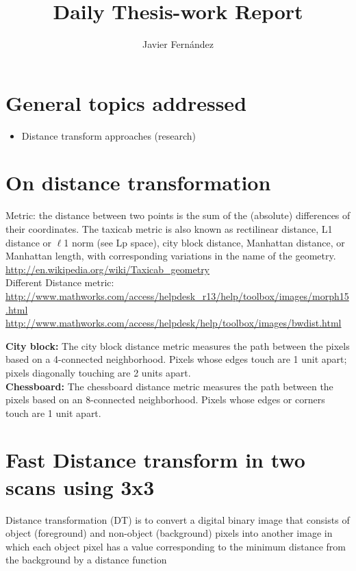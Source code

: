 \documentclass{article}
\title{Daily Thesis-work Report}
\author{Javier Fern\'andez}
\begin{document}
\maketitle

\section{General topics addressed}

\begin{itemize}
\item Distance transform approaches (research)
\end{itemize}

\section{On distance transformation}

Metric: the distance between two points is the sum of the (absolute)
differences of their coordinates. The taxicab metric is also known as 
rectilinear distance, L1 distance or $\ell$1 norm (see Lp space), city block
distance, Manhattan distance, or Manhattan length, with corresponding
variations in the name of the geometry. 
\url{http://en.wikipedia.org/wiki/Taxicab_geometry}\\

Different Distance metric: \url{http://www.mathworks.com/access/helpdesk_r13/help/toolbox/images/morph15.html}\\
\url{http://www.mathworks.com/access/helpdesk/help/toolbox/images/bwdist.html}


\textbf{City block: }
The city block distance metric measures the path between the pixels 
based on a 4-connected neighborhood. Pixels whose edges touch are 1 
unit apart; pixels diagonally touching are 2 units apart. \\

\textbf{Chessboard: }The chessboard distance metric measures the path 
between the pixels based on an 8-connected neighborhood. Pixels whose 
edges or corners touch are 1 unit apart.


\section{Fast Distance transform in two scans using 3x3}
Distance transformation (DT) is to convert a digital binary image 
that consists of object (foreground) and non-object (background) pixels
into another image in which each object pixel has a value corresponding
to the minimum distance from the background by a distance function
\end{document}
